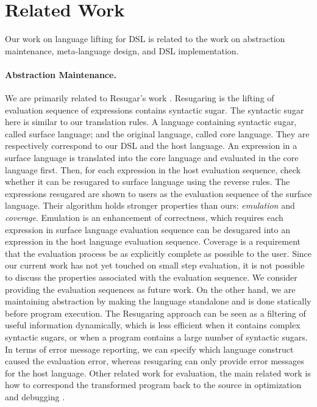 \section{Related Work}

Our work on language lifting for DSL is related to the work on abstraction maintenance, meta-language design, and DSL implementation.

\paragraph{Abstraction Maintenance.}
We are primarily related to Resugar's work \cite{resugar}.
Resugaring is the lifting of evaluation sequence of expressions contains syntactic sugar.
The syntactic sugar here is similar to our translation rules.
A language containing syntactic sugar, called surface language;
 and the original language, called core language.
They are respectively correspond to our DSL and the host language.
An expression in a surface language is translated into the core language and evaluated in the core language first.
Then, for each expression in the host evaluation sequence,
 check whether it can be resugared to surface language using the reverse rules.
The expressions resugared are shown to users as the evaluation sequence of the surface language.
Their algorithm holds stronger properties than ours: \textit{emulation} and \textit{coverage}.
Emulation is an enhancement of correctness,
 which requires each expression in surface language evaluation sequence can be desugared into an expression in the host language evaluation sequence.
Coverage is a requirement that the evaluation process be as explicitly complete as possible to the user.
Since our current work has not yet touched on small step evaluation, it is not possible to discuss the properties associated with the evaluation sequence.
We consider providing the evaluation sequences as future work.
On the other hand, we are maintaining abstraction by making the language standalone and is done statically before program execution.
The Resugaring approach can be seen as a filtering of useful information dynamically, which is less efficient when it contains complex syntactic sugars, or when a program contains a large number of syntactic sugars.
In terms of error message reporting, we can specify which language construct caused the evaluation error, whereas resugaring can only provide error messages for the host language.
Other related work for evaluation, the main related work is how to correspond the transformed program back to the source in optimization and debugging \cite{abs-1,abs-2,abs-3}.

